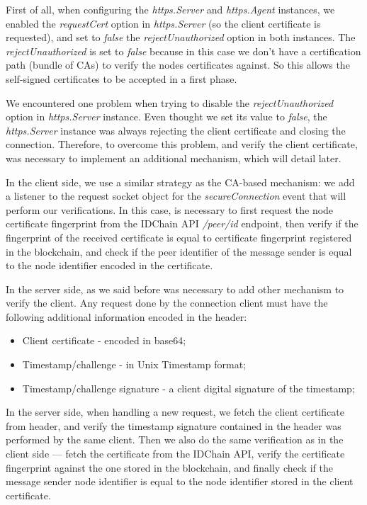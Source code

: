 First of all, when configuring the \textit{https.Server} and \textit{https.Agent} instances, we enabled the \textit{requestCert} option in \textit{https.Server} (so the client certificate is requested), and set to \textit{false} the \textit{rejectUnauthorized} option in both instances.
The \textit{rejectUnauthorized} is set to \textit{false} because in this case we don't have a certification path (bundle of CAs) to verify the nodes certificates against.
So this allows the self-signed certificates to be accepted in a first phase.

We encountered one problem when trying to disable the \textit{rejectUnauthorized} option in \textit{https.Server} instance.
Even thought we set its value to \textit{false}, the \textit{https.Server} instance was always rejecting the client certificate and closing the connection.
Therefore, to overcome this problem, and verify the client certificate, was necessary to implement an additional mechanism, which will detail later.

In the client side, we use a similar strategy as the CA-based mechanism: we add a listener to the request socket object for the \textit{secureConnection} event that will perform our verifications.
In this case, is necessary to first request the node certificate fingerprint from the IDChain API \textit{/peer/id} endpoint, then verify if the fingerprint of the received certificate is equal to certificate fingerprint registered in the blockchain, and check if the peer identifier of the message sender is equal to the node identifier encoded in the certificate.

In the server side, as we said before was necessary to add other mechanism to verify the client.
Any request done by the connection client must have the following additional information encoded in the header:

\begin{itemize}
  \item Client certificate - encoded in base64;
  \item Timestamp/challenge - in Unix Timestamp format;
  \item Timestamp/challenge signature - a client digital signature of the timestamp;
\end{itemize}

In the server side, when handling a new request, we fetch the client certificate from header, and verify the timestamp signature contained in the header was performed by the same client.
Then we also do the same verification as in the client side — fetch the certificate from the IDChain API, verify the certificate fingerprint against the one stored in the blockchain, and finally check if the message sender node identifier is equal to the node identifier stored in the client certificate.

